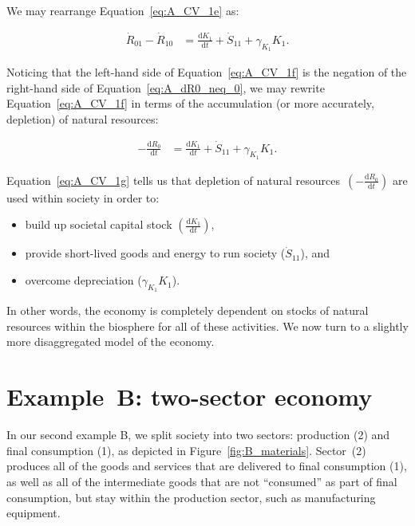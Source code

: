 We may rearrange Equation~\ref{eq:A_CV_1e} as:

 \begin{align}\label{eq:A_CV_1f}
	\dot{R}_{01} 
	- \dot{R}_{10}												&
	= 	\frac{\mathrm{d}K_{1}}{\mathrm{d}t}
	+ \dot{S}_{11}
	+ \gamma_{K_{1}}{K}_{1}.
\end{align}

Noticing that the left-hand side
of Equation~\ref{eq:A_CV_1f} is the negation 
of the right-hand side of Equation~\ref{eq:A_dR0_neq_0},
we may rewrite Equation~\ref{eq:A_CV_1f}
in terms of the accumulation 
(or more accurately, depletion)
of natural resources: 

 \begin{align}\label{eq:A_CV_1g}
	- 	\frac{\mathrm{d}R_{0}}{\mathrm{d}t}	&
	= 	\frac{\mathrm{d}K_{1}}{\mathrm{d}t}
	+ \dot{S}_{11}
	+ \gamma_{K_{1}}{K}_{1}.
\end{align}

Equation~\ref{eq:A_CV_1g} tells us that depletion of
natural resources~$\left(-\frac{\mathrm{d}R_{0}}{\mathrm{d}t}\right)$
are used within society in order to:

\begin{itemize}
	\item build up societal capital stock 
	$\left(\frac{\mathrm{d}K_{1}}{\mathrm{d}t}\right)$,
	\item provide short-lived goods and energy to 
	run society ($\dot{S}_{11}$), and
	\item overcome depreciation
	($\gamma_{K_{1}}{K}_{1}$).
\end{itemize}
\noindent{}In other words,
the economy is completely dependent on stocks of natural resources
within the biosphere for all of these activities.
We now turn to a slightly more disaggregated model of the economy.


\section{Example~B: two-sector economy} %
\label{sec:B_materials}

In our second example B, we split society into two sectors: 
production (2) and final consumption (1), 
as depicted in Figure~\ref{fig:B_materials}. 
Sector~(2) produces all of the goods and services 
that are delivered to final consumption (1), 
as well as all of the intermediate goods that are not ``consumed'' 
as part of final consumption, 
but stay within the production sector, 
such as manufacturing equipment.

